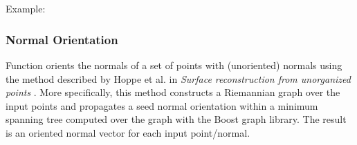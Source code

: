   \\
  \\


Example:



\subsubsection{Normal Orientation}

Function  orients the normals of a set of points with (unoriented) normals using the method described by Hoppe et al. in {\em Surface reconstruction from unorganized points} \cite{cgal:hddms-srup-92}. More specifically, this method constructs a Riemannian graph over the input points and propagates a seed normal orientation within a minimum spanning tree computed over the graph with the Boost graph library. The result is an oriented normal vector for each input point/normal.

  \\

